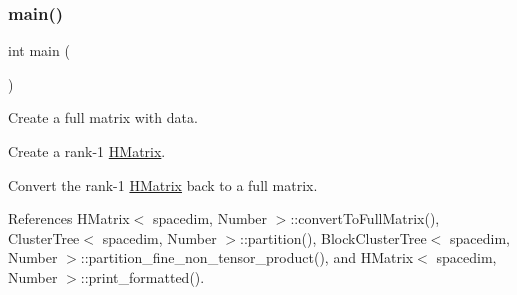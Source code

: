 \subsubsection{\texorpdfstring{main()}{main()}}
{\footnotesize\ttfamily int main (\begin{DoxyParamCaption}{ }\end{DoxyParamCaption})}

Create a full matrix with data.

Create a rank-\/1 \hyperlink{classHMatrix}{H\+Matrix}.

Convert the rank-\/1 \hyperlink{classHMatrix}{H\+Matrix} back to a full matrix.

References H\+Matrix$<$ spacedim, Number $>$\+::convert\+To\+Full\+Matrix(), Cluster\+Tree$<$ spacedim, Number $>$\+::partition(), Block\+Cluster\+Tree$<$ spacedim, Number $>$\+::partition\+\_\+fine\+\_\+non\+\_\+tensor\+\_\+product(), and H\+Matrix$<$ spacedim, Number $>$\+::print\+\_\+formatted().

